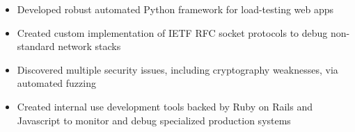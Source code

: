 \documentclass[10pt,a4paper]{altacv}
\newenvironment{tightitemize} %
{\begin{itemize}\itemsep1pt \parskip0pt \parsep0pt}
{\end{itemize}\vspace{-\topsep}}
\begin{document}
\begin{tightitemize}
    \item Developed robust automated Python framework for load-testing web apps
    \item Created custom implementation of IETF RFC socket protocols to debug 
        non-standard network stacks
    \item Discovered multiple security issues, including cryptography 
        weaknesses, via automated fuzzing
\end{tightitemize}

\smallskip
\divider

\begin{tightitemize}
\item Created internal use development tools backed by Ruby on Rails 
    and Javascript to monitor and debug specialized production systems
\end{tightitemize}










\end{document}
